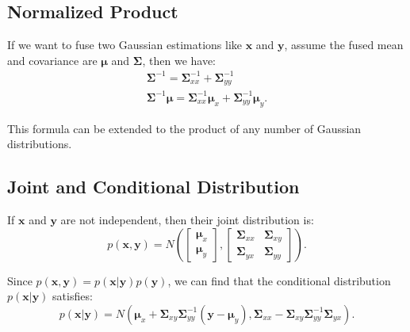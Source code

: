\subsection{Normalized Product}
If we want to fuse two Gaussian estimations like $\mathbf{x}$ and $\mathbf{y}$, assume the fused mean and covariance are $\boldsymbol{\mu}$ and $\boldsymbol{\Sigma}$, then we have:
\begin{equation}
\begin{array}{l}
{\boldsymbol{\Sigma}^{-1}} = \boldsymbol{\Sigma}_{xx}^{-1} + \boldsymbol{\Sigma}_{yy}^{-1} \\
\boldsymbol{\Sigma}^{-1} \boldsymbol{\mu} = \boldsymbol{\Sigma}_{xx}^{-1}{\boldsymbol{\mu}_x} + \boldsymbol{\Sigma}_{yy}^{-1}{\boldsymbol{\mu}_y}.
\end{array}
\end{equation}

This formula can be extended to the product of any number of Gaussian distributions.

\subsection{Joint and Conditional Distribution}
If $\mathbf{x}$ and $\mathbf{y}$ are not independent, then their joint distribution is: 
\begin{equation}
p(\mathbf{x}, \mathbf{y}) = N\left( {\left[ {\begin{array}{*{20}{c}}
		{{\boldsymbol{\mu}_x}}\\
		{{\boldsymbol{\mu}_y}}
		\end{array}} \right],\left[ {\begin{array}{*{20}{c}}
		{{\boldsymbol{\Sigma}_{xx}}}&{{\boldsymbol{\Sigma}_{xy}}}\\
		{{\boldsymbol{\Sigma}_{yx}}}&{{\boldsymbol{\Sigma}_{yy}}}
		\end{array}} \right]} \right).
\end{equation}

Since $p\left( {\mathbf{x}, \mathbf{y}} \right) = p\left( {\mathbf{x}|\mathbf{y}} \right)p\left( \mathbf{y} \right)$, we can find that the conditional distribution $p(\mathbf{x}|\mathbf{y})$ satisfies:
\begin{equation}
p\left( {\mathbf{x} | \mathbf{y} } \right) = N\left( {{\boldsymbol{\mu}_x} + {\boldsymbol{\Sigma}_{xy}} \boldsymbol{\Sigma}_{yy}^{ - 1} \left( {\mathbf{y} - {\boldsymbol{\mu}_y}} \right),{\boldsymbol{\Sigma}_{xx}} - {\boldsymbol{\Sigma}_{xy}} \boldsymbol{\Sigma}_{yy}^{ - 1}{\boldsymbol{\Sigma}_{yx}}} \right).
\end{equation}


